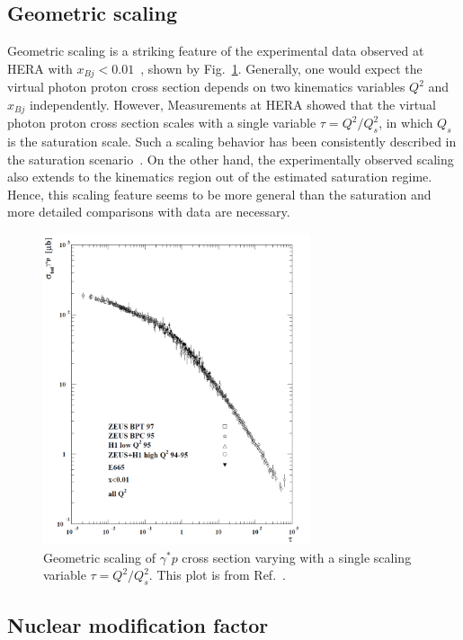 \subsection{Geometric scaling}
Geometric scaling is a striking feature of the experimental data observed at
HERA with $x_{Bj}<0.01$~\cite{Stasto:2000er}, shown by
Fig.~\ref{fig:geo_scaling}. Generally, one would expect the virtual photon
proton cross section depends on two kinematics variables $Q^{2}$ and $x_{Bj}$
independently. However, Measurements at HERA showed that the virtual photon
proton cross section scales with a single variable $\tau=Q^{2}/Q^{2}_{s}$, in
which $Q_{s}$ is the saturation scale. Such a scaling behavior has been
consistently described in the saturation scenario~\cite{GolecBiernat:1998js}. On
the other hand, the experimentally observed scaling also extends to the kinematics
region out of the estimated saturation regime. Hence, this scaling feature seems
to be more general than the saturation and more detailed comparisons with data
are necessary.
\begin{figure}
\centering
\includegraphics[width=0.7\textwidth]{plots/chpt3/geo_scaling.png}
\caption[Geometric scaling]{
Geometric scaling of $\gamma^{*}p$ cross section varying with a single scaling variable
$\tau=Q^{2}/Q^{2}_{s}$. This plot is from Ref.~\cite{Stasto:2000er}.}
\label{fig:geo_scaling}
\end{figure}

\subsection{Nuclear modification factor}


